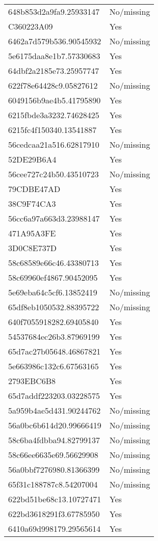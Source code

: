 \begin{tabular}{ll}
648b853d2a9fa9.25933147 & No/missing \\
C360223A09 & Yes \\
6462a7d579b536.90545932 & No/missing \\
5e6175daa8e1b7.57330683 & Yes \\
64dbf2a2185e73.25957747 & Yes \\
622f78e64428c9.05827612 & No/missing \\
6049156b9ae4b5.41795890 & Yes \\
6215fbde3a3232.74628425 & Yes \\
6215fc4f150340.13541887 & Yes \\
56cedcaa21a516.62817910 & No/missing \\
52DE29B6A4 & Yes \\
56cee727c24b50.43510723 & No/missing \\
79CDBE47AD & Yes \\
38C9F74CA3 & Yes \\
56cc6a97a663d3.23988147 & Yes \\
471A95A3FE & Yes \\
3D0C8E737D & Yes \\
58c68589e66c46.43380713 & Yes \\
58c69960ef4867.90452095 & Yes \\
5e69eba64c5cf6.13852419 & No/missing \\
65df8eb1050532.88395722 & No/missing \\
640f7055918282.69405840 & Yes \\
54537684ec26b3.87969199 & Yes \\
65d7ac27b05648.46867821 & Yes \\
5e663986c132c6.67563165 & Yes \\
2793EBC6B8 & Yes \\
65d7addf223203.03228575 & Yes \\
5a959b4ae5d431.90244762 & No/missing \\
56a0bc6b614d20.99666419 & No/missing \\
58c6ba4fdbba94.82799137 & No/missing \\
58c66ee6635e69.56629908 & No/missing \\
56a0bbf7276980.81366399 & No/missing \\
65f31c188787c8.54207004 & No/missing \\
622bd51be68c13.10727471 & Yes \\
622bd3618291f3.67785950 & Yes \\
6410a69d998179.29565614 & Yes \\

\end{tabular}
